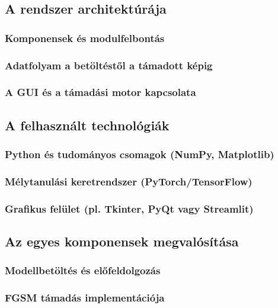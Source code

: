 \documentclass[12pt,a4paper]{article}
\begin{document}
\subsection{A rendszer architektúrája}

\subsubsection{Komponensek és modulfelbontás}

\subsubsection{Adatfolyam a betöltéstől a támadott képig}

\subsubsection{A GUI és a támadási motor kapcsolata}

\subsection{A felhasznált technológiák}

\subsubsection{Python és tudományos csomagok (NumPy, Matplotlib)}

\subsubsection{Mélytanulási keretrendszer (PyTorch/TensorFlow)}

\subsubsection{Grafikus felület (pl. Tkinter, PyQt vagy Streamlit)}

\subsection{Az egyes komponensek megvalósítása}

\subsubsection{Modellbetöltés és előfeldolgozás}

\subsubsection{FGSM támadás implementációja}
\end{document}
